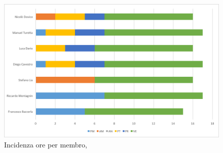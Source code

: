 \begin{figure}[H]
	\centering 
	\includegraphics[scale=0.7]{Immagini/GraficiPianoLavoro/VV.png}
	\caption{Incidenza ore per membro, \VV}
\end{figure}

\newpage
